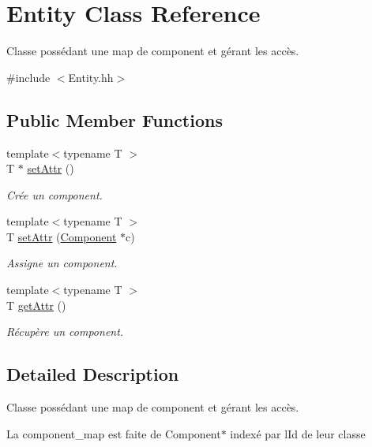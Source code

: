 \hypertarget{class_entity}{}\section{Entity Class Reference}
\label{class_entity}


Classe possédant une map de component et gérant les accès.  




{\ttfamily \#include $<$Entity.\+hh$>$}

\subsection*{Public Member Functions}
\begin{DoxyCompactItemize}
\item 
{\footnotesize template$<$typename T $>$ }\\T $\ast$ \hyperlink{class_entity_ab1565dea579b29e0431a9d1c106d8e34}{set\+Attr} ()
\begin{DoxyCompactList}\small\item\em Crée un component. \end{DoxyCompactList}\item 
{\footnotesize template$<$typename T $>$ }\\T \hyperlink{class_entity_afb39788bb9d49672d59ae6d367e7f6b2}{set\+Attr} (\hyperlink{class_component}{Component} $\ast$c)
\begin{DoxyCompactList}\small\item\em Assigne un component. \end{DoxyCompactList}\item 
{\footnotesize template$<$typename T $>$ }\\T \hyperlink{class_entity_a71c7f216536c0af004c0c62b0c2ceb3b}{get\+Attr} ()
\begin{DoxyCompactList}\small\item\em Récupère un component. \end{DoxyCompactList}\end{DoxyCompactItemize}


\subsection{Detailed Description}
Classe possédant une map de component et gérant les accès. 

La component\+\_\+map est faite de Component$\ast$ indexé par l\textquotesingle{}Id de leur classe 

